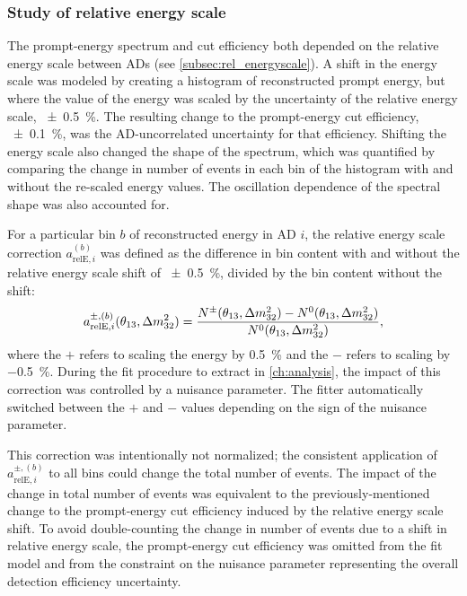 \subsubsection{Study of relative energy scale}

The prompt-energy spectrum and cut efficiency
both depended on the relative energy scale between ADs
(see \cref{subsec:rel_energyscale}).
A shift in the energy scale was modeled by
creating a histogram of reconstructed prompt energy,
but where the value of the energy was scaled
by the uncertainty of the relative energy scale, \SI{\pm0.5}{\percent}.
The resulting change to the prompt-energy cut efficiency, \SI{\pm0.1}{\percent},
was the AD-uncorrelated uncertainty for that efficiency.
Shifting the energy scale also changed the shape of the spectrum,
which was quantified by comparing the change in number of events
in each bin of the histogram with and without the re-scaled energy values.
The oscillation dependence of the spectral shape was also accounted for.

For a particular bin $b$ of reconstructed energy in AD $i$,
the relative energy scale correction $a_{\text{relE},i}^{(b)}$
was defined as the difference in bin content with and without
the relative energy scale shift of \SI{\pm0.5}{\percent},
divided by the bin content without the shift:
\begin{equation}
    a_{\text{relE},i}^{\pm,(b)}(\thetaot, \Delta m^2_{32}) =
    \frac{N^\pm(\thetaot, \Delta m^2_{32}) - N^0(\thetaot, \Delta m^2_{32})}%
    {N^0(\thetaot, \Delta m^2_{32})},
\end{equation}
where the $+$ refers to scaling the energy by \SI[retain-explicit-plus]{+0.5}{\percent}
and the $-$ refers to scaling by \SI{-0.5}{\percent}.
During the fit procedure to extract \thetaot{} in \cref{ch:analysis}, the impact of this correction
was controlled by a nuisance parameter.
The fitter automatically switched between the $+$ and $-$ values
depending on the sign of the nuisance parameter.

This correction was intentionally not normalized;
the consistent application of $a_{\text{relE},i}^{\pm,(b)}$ to all bins
could change the total number of events.
The impact of the change in total number of events
was equivalent to the previously-mentioned change
to the prompt-energy cut efficiency induced by the relative energy scale shift.
To avoid double-counting the change in number of events
due to a shift in relative energy scale,
the prompt-energy cut efficiency was omitted
from the fit model and from the constraint
on the nuisance parameter representing the overall detection efficiency uncertainty.

